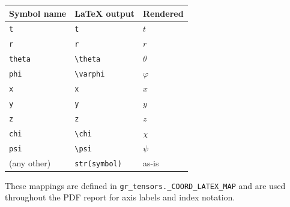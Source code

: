\documentclass[11pt,a4paper]{article}
\newcommand{\code}[1]{\texttt{\small#1}}
\begin{document}
\begin{center}
\begin{tabular}{lll}
  \toprule
  Symbol name & LaTeX output & Rendered \\
  \midrule
  \code{t}     & \code{t}          & $t$ \\
  \code{r}     & \code{r}          & $r$ \\
  \code{theta} & \code{\textbackslash theta}   & $\theta$ \\
  \code{phi}   & \code{\textbackslash varphi}  & $\varphi$ \\
  \code{x}     & \code{x}          & $x$ \\
  \code{y}     & \code{y}          & $y$ \\
  \code{z}     & \code{z}          & $z$ \\
  \code{chi}   & \code{\textbackslash chi}     & $\chi$ \\
  \code{psi}   & \code{\textbackslash psi}     & $\psi$ \\
  (any other)  & \code{str(symbol)} & as-is \\
  \bottomrule
\end{tabular}
\end{center}

These mappings are defined in \code{gr\_tensors.\_COORD\_LATEX\_MAP} and are
used throughout the PDF report for axis labels and index notation.
\end{document}
